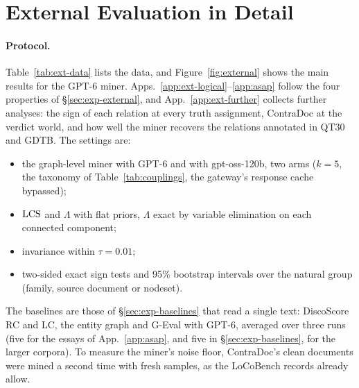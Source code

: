 
\section{External Evaluation in Detail}
\label{app:external}

\paragraph{Protocol.} Table~\ref{tab:ext-data} lists the data, and Figure~\ref{fig:external}
shows the main results for the GPT-6 miner.
Apps.~\ref{app:ext-logical}--\ref{app:asap} follow the four properties of
\S\ref{sec:exp-external}, and App.~\ref{app:ext-further} collects further analyses: the sign of
each relation at every truth assignment, ContraDoc at the verdict world, and how well the miner
recovers the relations annotated in QT30 and GDTB. The settings are:
\begin{itemize}[leftmargin=1.2em,itemsep=1pt,topsep=2pt]
\item the graph-level miner with GPT-6 and with gpt-oss-120b, two arms ($k=5$, the taxonomy of Table~\ref{tab:couplings}, the gateway's response
  cache bypassed);
\item $\mathrm{LCS}$ and $\Lambda$ with flat priors, $\Lambda$ exact by variable elimination on each
  connected component;
\item invariance within $\tau=0.01$;
\item two-sided exact sign tests and 95\% bootstrap intervals over the natural group (family,
  source document or nodeset).
\end{itemize}
The baselines are those of \S\ref{sec:exp-baselines} that read a single text: DiscoScore RC and
LC, the entity graph and G-Eval with GPT-6, averaged over three runs (five for the essays of App.~\ref{app:asap}, and five in
\S\ref{sec:exp-baselines}, for the larger corpora). To measure the miner's noise floor,
ContraDoc's clean documents were mined a second time with fresh samples, as the LoCoBench records
already allow.
